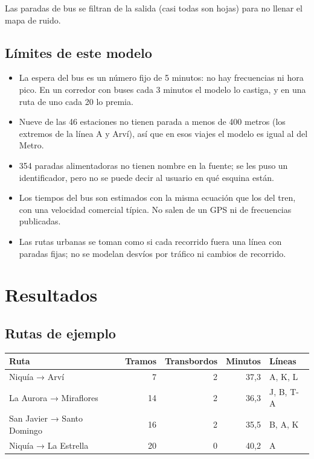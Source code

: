\documentclass[11pt,a4paper]{article}
\begin{document}
Las paradas de bus se filtran de la salida (casi todas son hojas) para no llenar
el mapa de ruido.

\subsection{Límites de este modelo}

\begin{itemize}
  \item La espera del bus es un número fijo de 5 minutos: no hay frecuencias ni
        hora pico. En un corredor con buses cada 3 minutos el modelo lo castiga,
        y en una ruta de uno cada 20 lo premia.
  \item Nueve de las 46 estaciones no tienen parada a menos de 400 metros (los
        extremos de la línea A y Arví), así que en esos viajes el modelo es igual
        al del Metro.
  \item 354 paradas alimentadoras no tienen nombre en la fuente; se les puso un
        identificador, pero no se puede decir al usuario en qué esquina están.
  \item Los tiempos del bus son estimados con la misma ecuación que los del tren,
        con una velocidad comercial típica. No salen de un GPS ni de frecuencias
        publicadas.
  \item Las rutas urbanas se toman como si cada recorrido fuera una línea con
        paradas fijas; no se modelan desvíos por tráfico ni cambios de recorrido.
\end{itemize}

\section{Resultados}

\subsection{Rutas de ejemplo}

\begin{center}
\small
\begin{tabular}{lrrrl}
\toprule
Ruta & Tramos & Transbordos & Minutos & Líneas \\
\midrule
Niquía → Arví              &  7 & 2 & 37,3 & A, K, L \\
La Aurora → Miraflores     & 14 & 2 & 36,3 & J, B, T-A \\
San Javier → Santo Domingo & 16 & 2 & 35,5 & B, A, K \\
Niquía → La Estrella       & 20 & 0 & 40,2 & A \\
\bottomrule
\end{tabular}
\label{tab:rutas}
\end{center}
\end{document}
